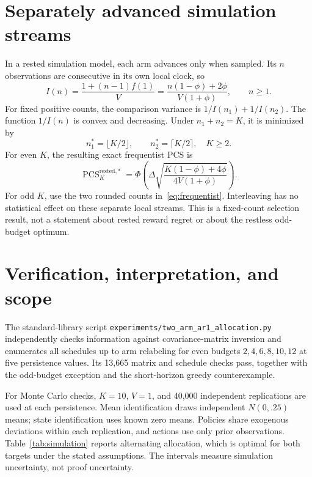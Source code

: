 \documentclass[11pt]{article}
\newcommand{\PCS}{\operatorname{PCS}}
\begin{document}
\section{Separately advanced simulation streams}
In a rested simulation model, each arm advances only when sampled. Its $n$ observations are consecutive in its own local clock, so
\begin{equation}
I(n)=\frac{1+(n-1)f(1)}V
=\frac{n(1-\phi)+2\phi}{V(1+\phi)},\qquad n\geq1.
\end{equation}
For fixed positive counts, the comparison variance is $1/I(n_1)+1/I(n_2)$. The function $1/I(n)$ is convex and decreasing. Under $n_1+n_2=K$, it is minimized by
\begin{equation}
\boxed{n_1^*=\lfloor K/2\rfloor,\qquad n_2^*=\lceil K/2\rceil,\quad K\geq2.}
\end{equation}
For even $K$, the resulting exact frequentist PCS is
\begin{equation}
\boxed{\PCS_K^{\mathrm{rested},*}
=\Phi\left(\Delta\sqrt{
\frac{K(1-\phi)+4\phi}{4V(1+\phi)}}\right).}
\end{equation}
For odd $K$, use the two rounded counts in~\eqref{eq:frequentist}. Interleaving has no statistical effect on these separate local streams. This is a fixed-count selection result, not a statement about rested reward regret or about the restless odd-budget optimum.

\section{Verification, interpretation, and scope}
The standard-library script \texttt{experiments/two\_arm\_ar1\_allocation.py} independently checks information against covariance-matrix inversion and enumerates all schedules up to arm relabeling for even budgets $2,4,6,8,10,12$ at five persistence values. Its 13,665 matrix and schedule checks pass, together with the odd-budget exception and the short-horizon greedy counterexample.

For Monte Carlo checks, $K=10$, $V=1$, and 40,000 independent replications are used at each persistence. Mean identification draws independent $N(0,.25)$ means; state identification uses known zero means. Policies share exogenous deviations within each replication, and actions use only prior observations. Table~\ref{tab:simulation} reports alternating allocation, which is optimal for both targets under the stated assumptions. The intervals measure simulation uncertainty, not proof uncertainty.
\end{document}
